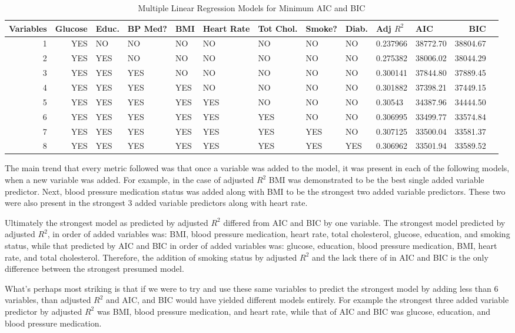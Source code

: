 \documentclass{article}\usepackage[]{graphicx}\usepackage[]{color}
\begin{document}
   \begin{table}[ht]
   \begin{tiny}
\centering
\begin{tabular}{rrlllllllllrr}
  \hline
  Variables & Glucose & Educ. & BP Med? & BMI & Heart Rate & Tot Chol. & Smoke? & Diab. & Adj $R^2$ & AIC & BIC \\ 
  \hline
  1 & YES & NO & NO & NO & NO & NO & NO & NO & 0.237966 & 38772.70 & 38804.67 \\ 
     2 & YES & YES & NO & NO & NO & NO & NO & NO & 0.275382 & 38006.02 & 38044.29 \\ 
     3 & YES & YES & YES & NO & NO & NO & NO & NO & 0.300141 & 37844.80 & 37889.45 \\ 
     4 & YES & YES & YES & YES & NO & NO & NO & NO & 0.301882 & 37398.21 & 37449.15 \\ 
     5 & YES & YES & YES & YES & YES & NO & NO & NO & 0.30543 & 34387.96 & 34444.50 \\ 
     6 & YES & YES & YES & YES & YES & YES & NO & NO & 0.306995 & 33499.77 & 33574.84 \\ 
     7 & YES & YES & YES & YES & YES & YES & YES & NO & 0.307125 & 33500.04 & 33581.37 \\ 
     8 & YES & YES & YES & YES & YES & YES & YES & YES & 0.306962 & 33501.94 & 33589.52 \\ 
   \hline
\end{tabular}
\caption{Multiple Linear Regression Models for Minimum AIC and BIC}
\end{tiny}
\end{table}

The main trend that every metric followed was that once a variable was added to the model, it was present in each of the following models, when a new variable was added.  For example, in the case of adjusted $R^2$ BMI was demonstrated to be the best single added variable predictor. Next, blood pressure medication status was added along with BMI to be the strongest two added variable predictors.  These two were also present in the strongest 3 added variable predictors along with heart rate.  

Ultimately the strongest model as predicted by adjusted $R^2$ differed from AIC and BIC by one variable. The strongest model predicted by adjusted $R^2$, in order of added variables was: BMI, blood pressure medication, heart rate, total cholesterol, glucose, education, and smoking status, while that predicted by AIC and BIC in order of added variables was: glucose, education, blood pressure medication, BMI, heart rate, and total cholesterol. Therefore, the addition of smoking status by adjusted $R^2$ and the lack there of in AIC and BIC is the only difference between the  strongest presumed model.

What's perhaps most striking is that if we were to try and use these same variables to predict the strongest model by adding less than 6 variables, than adjusted $R^2$ and AIC, and BIC would have yielded different models entirely.  For example the strongest three added variable predictor by adjusted $R^2$ was BMI, blood pressure medication, and heart rate,  while that of AIC and BIC was glucose, education, and blood pressure medication.
\end{document}
